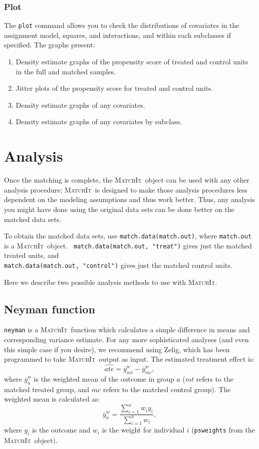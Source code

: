 \documentclass[oneside,letterpaper,titlepage]{article}
\newcommand{\MatchIt}{\textsc{MatchIt}}
\begin{document}
\subsubsection{Plot}
The \texttt{plot} command allows you to check the distributions of
covariates in the assignment model, squares, and interactions, and
within each subclasses if specified.  The graphs present:
\begin{enumerate}
\item Density estimate graphs of the propensity score of treated and
  control units in the full and matched samples.
\item Jitter plots of the propensity score for treated and control
  units.
\item Density estimate graphs of any covariates.
\item Density estimate graphs of any covariates by subclass.
\end{enumerate}

\section{Analysis}

Once the matching is complete, the \MatchIt\ object can be used with
any other analysis procedure; \MatchIt\ is designed to make those
analysis procedures less dependent on the modeling assumptions and
thus work better.  Thus, any analysis you might have done using the
original data sets can be done better on the matched data sets.

To obtain the matched data sets, use {\tt match.data(match.out)},
where {\tt match.out} is a \MatchIt\ object.  {\tt
  match.data(match.out, "treat")} gives just the matched treated
units, and  \\ {\tt match.data(match.out, "control")} gives just the
matched control units.

Here we describe two possible analysis methods to use with \MatchIt.

\subsection{Neyman function}

{\tt neyman} is a \MatchIt\ function which calculates a simple
difference in means and corresponding variance estimate.  For any more
sophisticated analyses (and even this simple case if you desire), we
recommend using Zelig, which has been programmed to take \MatchIt\ 
output as input.  The estimated treatment effect is:
\begin{equation}
\label{ate} 
\widehat{ate} = \overline{y}_{mt}^w-\overline{y}_{mc}^w,
\end{equation}
where $\overline{y}_a^w$ is the weighted mean of the outcome in group
$a$ ($mt$ refers to the matched treated group, and $mc$ refers to the
matched control group).  The weighted mean is calculated as:
$$\overline{y}_a^w = \frac{\sum_{i=1}^n w_i y_i}{\sum_{i=1}^n w_i},$$
where $y_i$ is the outcome and $w_i$ is the weight for individual $i$
({\tt psweights} from the \MatchIt\ object).
\end{document}
